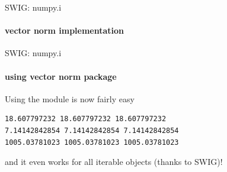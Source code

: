 \documentclass[german]{beamer}
\begin{document}
\begin{frame}[fragile]{SWIG: numpy.i}
\framesubtitle{vector norm implementation}

\end{frame}
\begin{frame}[fragile]{SWIG: numpy.i}
\framesubtitle{using vector norm package}

Using the module is now fairly easy

\begin{lstlisting}[language=bash,caption=output]
18.607797232 18.607797232 18.607797232
7.14142842854 7.14142842854 7.14142842854
1005.03781023 1005.03781023 1005.03781023
\end{lstlisting}
and it even works for all iterable objects (thanks to SWIG)!
\end{frame}

\end{document}
